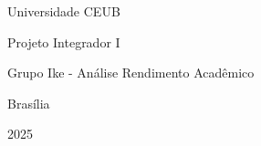 \begin{titlepage}
    \centering
    \vspace*{5cm}
    {\Large Universidade CEUB \par}
    {\large Projeto Integrador I \par}
    {\large Grupo Ike - Análise Rendimento Acadêmico\par}
    {\large Brasília \par}
    {\large 2025 \par}
\end{titlepage}

